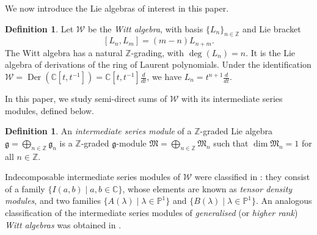 \documentclass[11pt, svgnames]{amsart}
\newcommand{\g}{\ensuremath{\mathfrak{g}}}
\newcommand{\M}{\mathfrak{M}}
\newcommand{\ZZ}{\mathbb{Z}}
\newcommand{\CC}{\mathbb{C}}
\newcommand{\PP}{\mathbb{P}}
\newcommand{\W}{\mathcal{W}}
\DeclareMathOperator{\Der}{Der}
\newcommand{\diff}[1]{\frac{d}{d#1}}
\theoremstyle{definition}
\newtheorem{defn}[proposition]{Definition}
\begin{document}
We now introduce the Lie algebras of interest in this paper. 

\begin{defn}
\label{def: Witt algebra}
Let $\W$ be the \emph{Witt algebra}, with basis $\{L_n\}_{n \in \ZZ}$ and Lie bracket
$$[L_n,L_m] = (m - n)L_{n+m}.$$
The Witt algebra has a natural $\ZZ$-grading, with $\deg(L_n) = n$. It is the Lie algebra of derivations of the ring of Laurent polynomials. Under the identification $\W = \Der(\CC[t,t^{-1}]) = \CC[t,t^{-1}]\diff{t}$, we have $L_n = t^{n+1}\diff{t}$.
\end{defn}

In this paper, we study semi-direct sums of $\W$ with its intermediate series modules, defined below.

\begin{defn} \label{def: intermediate series module}
    An \emph{intermediate series module} of a $\ZZ$-graded Lie algebra $\g = \bigoplus_{n \in \ZZ} \g_n$ is a $\ZZ$-graded $\g$-module $\M = \bigoplus_{n \in \ZZ} \M_n$ such that $\dim \M_n = 1$ for all $n \in \ZZ$. 
\end{defn}

Indecomposable intermediate series modules of $\W$ were classified in \cite{KaplanskySantharoubane}: they consist of a family $\{I(a,b) \mid a,b \in \CC\}$, whose elements are known as \emph{tensor density modules}, and two families $\{A(\lambda) \mid \lambda \in \PP^1\}$ and $\{B(\lambda) \mid \lambda \in \PP^1\}$. An analogous classification of the intermediate series modules of \emph{generalised} (or \emph{higher rank}) \emph{Witt algebras} was obtained in \cite{Su}.
\end{document}
